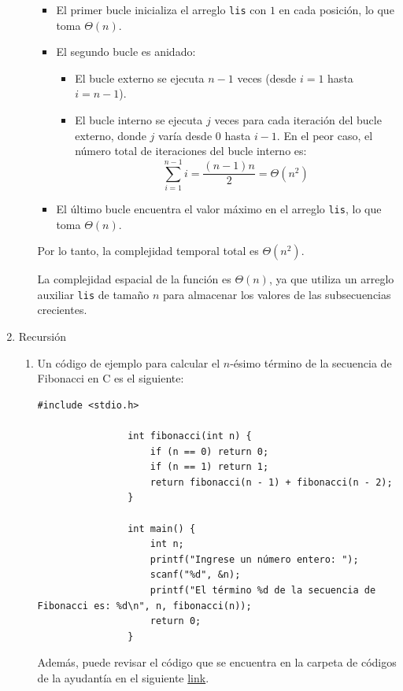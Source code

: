 \documentclass[12pt]{article}
\begin{document}
\begin{enumerate}
\begin{enumerate}[label*=\arabic*.]
                \begin{itemize}
                    \item El primer bucle inicializa el arreglo \lstinline[language=C]|lis| con $1$ en cada posición, lo que toma $\Theta(n)$.
                    \item El segundo bucle es anidado:
                        \begin{itemize}
                            \item El bucle externo se ejecuta $n-1$ veces (desde $i = 1$ hasta $i = n-1$).
                            \item El bucle interno se ejecuta $j$ veces para cada iteración del bucle externo, donde $j$ varía desde $0$ hasta $i-1$. En el peor caso, el número total de iteraciones del bucle interno es:
                            \[
                            \sum_{i=1}^{n-1} i = \frac{(n-1)n}{2} = \Theta(n^2)
                            \]
                        \end{itemize}
                    \item El último bucle encuentra el valor máximo en el arreglo \lstinline[language=C]|lis|, lo que toma $\Theta(n)$.
                \end{itemize}

                Por lo tanto, la complejidad temporal total es $\Theta(n^2)$.

                La complejidad espacial de la función es $\Theta(n)$, ya que utiliza un arreglo auxiliar \lstinline[language=C]|lis| de tamaño $n$ para almacenar los valores de las subsecuencias crecientes.
            \end{enumerate}

            \item Recursión
            \begin{enumerate}[label*=\arabic*.]
                \item Un código de ejemplo para calcular el $n$-ésimo término de la secuencia de Fibonacci en C es el siguiente:
                \begin{lstlisting}[xleftmargin=-9.6em, inputencoding=utf8]
                #include <stdio.h>

                int fibonacci(int n) {
                    if (n == 0) return 0;
                    if (n == 1) return 1;
                    return fibonacci(n - 1) + fibonacci(n - 2);
                }

                int main() {
                    int n;
                    printf("Ingrese un número entero: ");
                    scanf("%d", &n);
                    printf("El término %d de la secuencia de Fibonacci es: %d\n", n, fibonacci(n));
                    return 0;
                }
                \end{lstlisting}
                Además, puede revisar el código que se encuentra en la carpeta de códigos de la ayudantía en el siguiente \href{https://github.com/otrab/EDA/tree/ayudant%C3%ADas}{link}.
            \end{enumerate}
        \end{enumerate}
\end{document}

